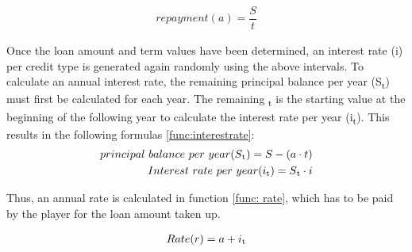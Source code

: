 \begin{equation}
\label{func:repayment}
\begin{aligned}
repayment (a)= {\dfrac{S}{t}}
\end{aligned}    
\end{equation}

Once the loan amount and term values have been determined, an interest rate (i) per credit type is generated again randomly using the above intervals. To calculate an annual interest rate, the remaining principal balance per year (S\textsubscript{t}) must first be calculated for each year. The remaining \textsubscript{t}  is the starting value at the beginning of the following year to calculate the interest rate per year (i\textsubscript{t}). This results in the following formulas \ref{func:interestrate}:
\begin{equation}
\label{func:interestrate}
\begin{aligned}
principal \ balance \ per \ year (S\textsubscript{t})= S- (a \cdot t)\\
Interest \ rate \ per \ year (i\textsubscript{t}) = S\textsubscript{t} \cdot i
\end{aligned}    
\end{equation}

Thus, an annual rate is calculated in function \ref{func: rate}, which has to be paid by the player for the loan amount taken up.

\begin{equation}
\label{func: rate}
\begin{aligned}
Rate (r)= a+ i\textsubscript{t}
\end{aligned}    
\end{equation}


